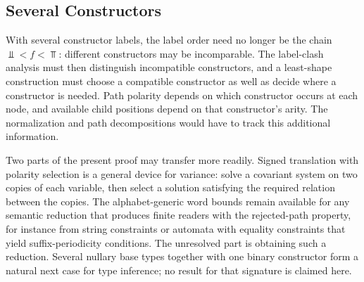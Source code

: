 \subsection{Several Constructors}
With several constructor labels, the label order need no longer be the
chain $\Bot<f<\Top$: different constructors may be incomparable.
The label-clash analysis must then distinguish incompatible constructors,
and a least-shape construction must choose a compatible constructor as
well as decide where a constructor is needed. Path polarity depends on
which constructor occurs at each node, and available child positions depend
on that constructor's arity. The normalization and path decompositions
would have to track this additional information.

Two parts of the present proof may transfer more readily. Signed
translation with polarity selection is a general device for variance:
solve a covariant system on two copies of each variable, then select a
solution satisfying the required relation between the copies. The
alphabet-generic word bounds remain available for any semantic reduction
that produces finite readers with the rejected-path property, for instance
from string constraints or automata with equality constraints that yield
suffix-periodicity conditions. The unresolved part is obtaining such a
reduction. Several nullary base types together with one binary constructor
form a natural next case for type inference; no result for that signature
is claimed here.



